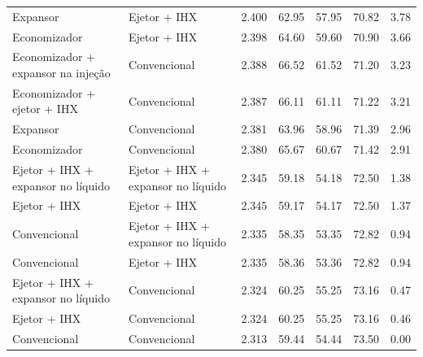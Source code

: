 {\begin{tabular}{llrrrrr}
Expansor & Ejetor + IHX & 2.400 & 62.95 & 57.95 & 70.82 & 3.78 \\
Economizador & Ejetor + IHX & 2.398 & 64.60 & 59.60 & 70.90 & 3.66 \\
Economizador + expansor na injeção & Convencional & 2.388 & 66.52 & 61.52 & 71.20 & 3.23 \\
Economizador + ejetor + IHX & Convencional & 2.387 & 66.11 & 61.11 & 71.22 & 3.21 \\
Expansor & Convencional & 2.381 & 63.96 & 58.96 & 71.39 & 2.96 \\
Economizador & Convencional & 2.380 & 65.67 & 60.67 & 71.42 & 2.91 \\
Ejetor + IHX + expansor no líquido & Ejetor + IHX + expansor no líquido & 2.345 & 59.18 & 54.18 & 72.50 & 1.38 \\
Ejetor + IHX & Ejetor + IHX & 2.345 & 59.17 & 54.17 & 72.50 & 1.37 \\
Convencional & Ejetor + IHX + expansor no líquido & 2.335 & 58.35 & 53.35 & 72.82 & 0.94 \\
Convencional & Ejetor + IHX & 2.335 & 58.36 & 53.36 & 72.82 & 0.94 \\
Ejetor + IHX + expansor no líquido & Convencional & 2.324 & 60.25 & 55.25 & 73.16 & 0.47 \\
Ejetor + IHX & Convencional & 2.324 & 60.25 & 55.25 & 73.16 & 0.46 \\
Convencional & Convencional & 2.313 & 59.44 & 54.44 & 73.50 & 0.00 \\
\bottomrule
\end{tabular}
}
